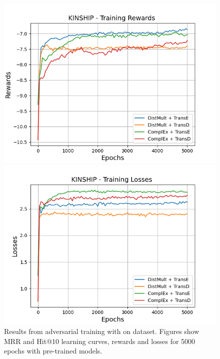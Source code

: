 \begin{figure}
    \begin{minipage}{.5\textwidth}
      \centering
      \includegraphics[width=\linewidth]{figures/results/gan_train/pretrained/uncertainty/max/entropy/kinship/5k_epochs/uncertainty_kinship_rew.png}
    \end{minipage}%
     \begin{minipage}{.5\textwidth}
      \centering
      \includegraphics[width=\linewidth]{figures/results/gan_train/pretrained/uncertainty/max/entropy/kinship/5k_epochs/uncertainty_kinship_losses.png}
    \end{minipage}%
    \caption{Results from adversarial training with \usmax on \kinship dataset.
    Figures show MRR and Hit@10 learning curves, rewards and losses for 5000 epochs with pre-trained models.}
    \label{fig:gan_train_pretrained_usmax_kinship}
\end{figure}
